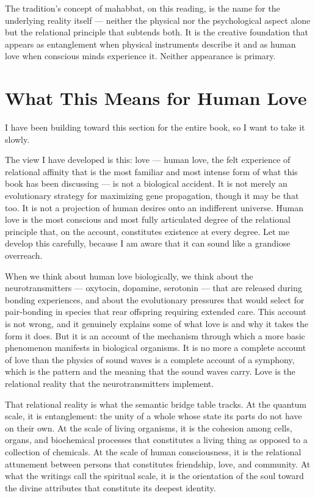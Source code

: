 The \bahai tradition's concept of mahabbat, on this reading, is the name for the underlying reality itself — neither the physical nor the psychological aspect alone but the relational principle that subtends both. It is the creative foundation that appears as entanglement when physical instruments describe it and as human love when conscious minds experience it. Neither appearance is primary.


\section{What This Means for Human Love}
\label{sec:ch14-human-love}

I have been building toward this section for the entire book, so I want to take it slowly.

The view I have developed is this: love — human love, the felt experience of relational affinity that is the most familiar and most intense form of what this book has been discussing — is not a biological accident. It is not merely an evolutionary strategy for maximizing gene propagation, though it may be that too. It is not a projection of human desires onto an indifferent universe. Human love is the most conscious and most fully articulated degree of the relational principle that, on the \bahai account, constitutes existence at every degree. Let me develop this carefully, because I am aware that it can sound like a grandiose overreach.

When we think about human love biologically, we think about the neurotransmitters — oxytocin, dopamine, serotonin — that are released during bonding experiences, and about the evolutionary pressures that would select for pair-bonding in species that rear offspring requiring extended care. This account is not wrong, and it genuinely explains some of what love is and why it takes the form it does. But it is an account of the mechanism through which a more basic phenomenon manifests in biological organisms. It is no more a complete account of love than the physics of sound waves is a complete account of a symphony, which is the pattern and the meaning that the sound waves carry. Love is the relational reality that the neurotransmitters implement.

That relational reality is what the semantic bridge table tracks. At the quantum scale, it is entanglement: the unity of a whole whose state its parts do not have on their own. At the scale of living organisms, it is the cohesion among cells, organs, and biochemical processes that constitutes a living thing as opposed to a collection of chemicals. At the scale of human consciousness, it is the relational attunement between persons that constitutes friendship, love, and community. At what the \bahai writings call the spiritual scale, it is the orientation of the soul toward the divine attributes that constitute its deepest identity.

